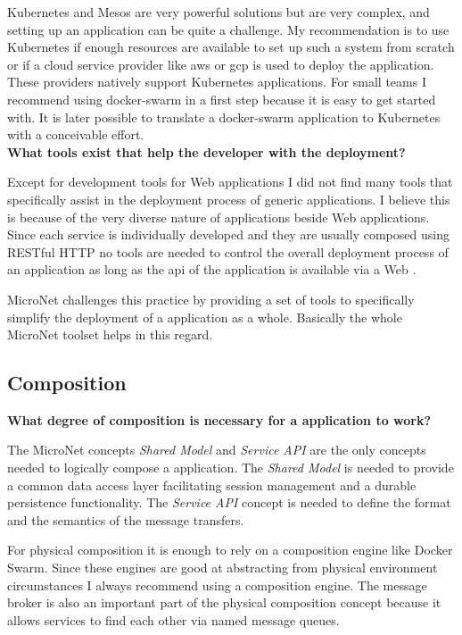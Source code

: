 Kubernetes and Mesos are very powerful solutions but are very complex, and
setting up an application can be quite a challenge. My recommendation is to use
Kubernetes if enough resources are available to set up such a system from
scratch or if a cloud service provider like \gls{aws} or \gls{gcp} is used to
deploy the application. These providers natively support Kubernetes
applications. For small teams I recommend using docker-swarm in a first step
because it is easy to get started with. It is later possible to translate a
docker-swarm application to Kubernetes with a conceivable effort.\\

\noindent
\textbf{What tools exist that help the developer with the deployment?}

Except for development tools for Web applications I did not find many tools that
specifically assist in the deployment process of generic \ms{} applications. I
believe this is because of the very diverse nature of \ms{} applications beside
Web applications. Since each service is individually developed and they are
usually composed using RESTful HTTP no tools are needed to control the overall
deployment process of an application as long as the \gls{api} of the application
is available via a Web \ms{}.

MicroNet challenges this practice by providing a set of tools to specifically
simplify the deployment of a \ms{} application as a whole. Basically the whole
MicroNet toolset helps in this regard.

\subsection{\ms{} Composition}

\noindent
\textbf{What degree of composition is necessary for a \ms{} application
to work?}

The MicroNet concepts \textit{Shared Model} and \textit{Service API} are the
only concepts needed to logically compose a \ms{} application. The
\textit{Shared Model} is needed to provide a common data access layer
facilitating session management and a durable persistence functionality. The
\textit{Service API} concept is needed to define the format and the semantics of
the message transfers.

For physical composition it is enough to rely on a composition engine like
Docker Swarm. Since these engines are good at abstracting from physical
environment circumstances I always recommend using a composition engine. The
message broker is also an important part of the physical composition concept
because it allows services to find each other via named message queues.\\

